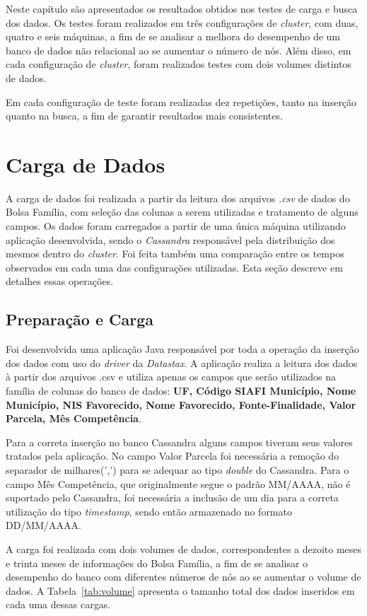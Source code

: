 Neste capítulo são apresentados os resultados obtidos nos testes de carga e busca dos dados. Os testes foram realizados em três configurações de \emph{cluster}, com duas, quatro e seis máquinas, a fim de se analisar a melhora do desempenho de um banco de dados não relacional ao se aumentar o número de nós. Além disso, em cada configuração de \emph{cluster}, foram realizados testes com dois volumes distintos de dados.

Em cada configuração de teste foram realizadas dez repetições, tanto na inserção quanto na busca, a fim de garantir resultados mais consistentes. 

\section{Carga de Dados}
A carga de dados foi realizada a partir da leitura dos arquivos \emph{.csv} de dados do Bolsa Família, com seleção das colunas a serem utilizadas e tratamento de alguns campos.
Os dados foram carregados a partir de uma única máquina utilizando aplicação desenvolvida, sendo o \emph{Cassandra} responsável pela distribuição dos mesmos dentro do \emph{cluster}. Foi feita também uma comparação entre os tempos observados em cada uma das configurações utilizadas. Esta seção descreve em detalhes essas operações.

\subsection{Preparação e Carga}
Foi desenvolvida uma aplicação Java responsável por toda a operação da inserção dos dados com uso do \emph{driver} da \emph{Datastax}. A aplicação realiza a leitura dos dados à partir dos arquivos .csv e utiliza apenas os campos que serão utilizados na família de colunas do banco de dados: \textbf{UF, Código SIAFI Município, Nome Município, NIS Favorecido, Nome Favorecido, Fonte-Finalidade, Valor Parcela, Mês Competência}. 

Para a correta inserção no banco Cassandra alguns campos tiveram seus valores tratados pela aplicação. No campo Valor Parcela foi necessária a remoção do separador de milhares(',') para se adequar ao tipo \emph{double} do Cassandra. Para o campo Mês Competência, que originalmente segue o padrão MM/AAAA, não é suportado pelo Cassandra, foi necessária a inclusão de um dia para a correta utilização do tipo \emph{timestamp}, sendo então armazenado no formato DD/MM/AAAA.

A carga foi realizada com dois volumes de dados, correspondentes a dezoito meses e trinta meses de informações do Bolsa Família, a fim de se analisar o desempenho do banco com diferentes números de nós ao se aumentar o volume de dados. A Tabela~\ref{tab:volume} apresenta o tamanho total dos dados inseridos em cada uma dessas cargas.

